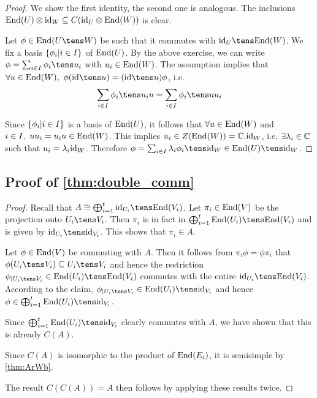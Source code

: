 \documentclass[twoside = false,	%
		headsepline,		%
		parskip = true,
		]{scrbook}						%
\begin{document}
        \begin{proof}
            We show the first identity, the second one is analogous. The inclusions $\mathrm{End}(U) \otimes \mathrm{id}_W\subseteq C(\mathrm{id}_U\otimes \mathrm{End}(W))$ is clear.

            Let $\phi\in\End(U\tens W)$ be such that it commutes with $\id_U \tens \End(W)$. We fix a basis $\left\{ \phi_i | i\in I\right\}$ of $\mathrm{End}(U)$. By the above exercise, we can write $\phi = \sum_{i\in I} \phi_i \tens u_i$ with $u_i \in \mathrm{End}(W)$. The assumption implies that $\forall u\in \End(W),\ \phi(\id\tens u) = (\id \tens u)\phi$, i.e. $$\sum_{i\in I}\phi_i\tens u_iu = \sum_{i\in I} \phi_i\tens uu_i$$

            Since $\left\{ \phi_i| i\in I\right\}$ is a basis of $\mathrm{End}(U)$, it follows that $\forall u \in \mathrm{End}(W)$ and $i\in I,\ uu_i= u_iu \in \mathrm{End}(W)$. This implies $u_i\in Z(\mathrm{End}(W)) = \mathbb C.\mathrm{id}_W$, i.e. $\exists\lambda_i\in\mathbb C$ such that $u_i=\lambda_i\mathrm{id}_W$. Therefore $\phi=\sum_{i\in I}\lambda_i\phi_i\tens\id_W\in\End(U)\tens\id_W$.
        \end{proof}

    \subsection{Proof of \ref{thm:double_comm}}
        \begin{proof}
            Recall that $A\cong \bigoplus_{i=1}^t \id_{U_i}\tens \End(V_i)$. Let $\pi_i\in\mathrm{End}(V)$ be the projection onto $U_i\tens V_i$. Then $\pi_i$ is in fact in $\bigoplus_{i=1}^t \End(U_i) \tens \End(V_i)$ and is given by $\id_{U_i} \tens \id_{V_i}$. This shows that $\pi_i\in A$.

            Let $\phi\in\mathrm{End}(V)$ be commuting with $A$. Then it follows from $\pi_i\phi = \phi\pi_i$ that $\phi(U_i\tens V_i)\subseteq U_i\tens V_i$ and hence the restriction $\phi_{|U_i\tens V_i}\in\End(U_i)\tens \End(V_i)$ commutes with the entire $\id_{U_i}\tens \End(V_i)$. According to the claim, $\phi_{|U_i\tens V_i}\in\End(U_i)\tens \id_{V_i}$ and hence $\phi\in\bigoplus_{i=1}^t \End(U_i)\tens\id_{V_i}$.

            Since $\bigoplus_{i=1}^t \End(U_i)\tens\id_{V_i}$ clearly commutes with $A$, we have shown that this is already $C(A)$.
            
            Since $C(A)$ is isomorphic to the product of $\mathrm{End}(E_i)$, it is semisimple by \ref{thm:ArWb}.

            The result $C(C(A))=A$ then follows by applying these results twice.
        \end{proof}
\end{document}
